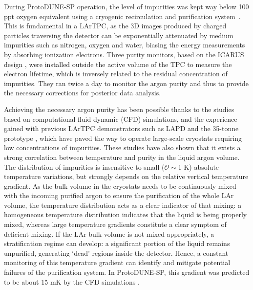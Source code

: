 
During ProtoDUNE-SP operation, the level of impurities was kept way below 100 ppt oxygen equivalent using a cryogenic recirculation and purification system~\cite{pdsp_tdr,pdsp_2}. This is fundamental in a LArTPC, as the 3D images produced by charged particles traversing the detector can be exponentially attenuated by medium impurities such as nitrogen, oxygen and water, biasing the energy measurements by absorbing ionization electrons. Three purity monitors, based on the ICARUS design \cite{PrMs}, were installed outside the active volume of the TPC to measure the electron lifetime, which is inversely related to the residual concentration of impurities. They ran twice a day to monitor the argon purity and thus to provide the necessary corrections for posterior data analysis. 

Achieving the necessary argon purity has been possible thanks to the studies based on computational fluid dynamic (CFD) simulations, and the experience gained with previous LArTPC demonstrators such as LAPD \cite{lapd} and the 35-tonne prototype \cite{35t_1,35t_2}, which have paved the way to operate large-scale cryostats requiring low concentrations of impurities. These studies have also shown that it exists a strong correlation between temperature and purity in the liquid argon volume. The distribution of impurities is insensitive to small ($\mathcal{O}\sim$1 K) absolute temperature variations, but strongly depends on the relative vertical temperature gradient. As the bulk volume in the cryostats needs to be continuously mixed with the incoming purified argon to ensure the purification of the whole LAr volume, the temperature distribution acts as a clear indicator of that mixing: a homogeneous temperature distribution indicates that the liquid is being properly mixed, whereas large temperature gradients constitute a clear symptom of deficient mixing. If the LAr bulk volume is not mixed appropriately, a stratification regime can develop: a significant portion of the liquid remains unpurified, generating `dead' regions inside the detector. Hence, a constant monitoring of this temperature gradient can identify and mitigate potential failures of the purification system. In ProtoDUNE-SP, this gradient was predicted to be about 15 mK by the CFD simulations \cite{pdsp_tdr,dune_tdr4}. 

